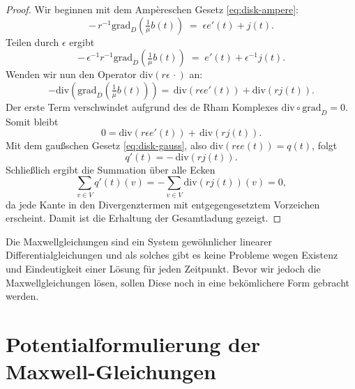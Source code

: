 \documentclass[11pt,a4paper,leqno]{report}
\numberwithin{equation}{chapter}
\begin{document}
\begin{proof}
	Wir beginnen mit dem Ampèreschen Gesetz \eqref{eq:disk-ampere}:
	\[
	-\, r^{-1}\mathrm{grad}_D\!\left(\tfrac{1}{\mu} b(t)\right) \;=\; \epsilon e'(t) + j(t).
	\]
	Teilen durch \(\epsilon\) ergibt
	\[
	-\, \epsilon^{-1}r^{-1}\mathrm{grad}_D\!\left(\tfrac{1}{\mu} b(t)\right) \;=\;  e'(t) + \epsilon^{-1}j(t).
	\]
	Wenden wir nun den Operator \(\mathrm{div}(r\epsilon\,\cdot)\) an:
	\[
	-\mathrm{div}(\mathrm{grad}_D\!\left(\tfrac{1}{\mu} b(t)\right)) 
	= \,\mathrm{div}(r\epsilon e'(t)) + \mathrm{div}(r j(t)).
	\]
	Der erste Term verschwindet aufgrund des de Rham Komplexes \(\mathrm{div}\circ \mathrm{grad}_D = 0\).  
	Somit bleibt
	\[
	0=\mathrm{div}(r\epsilon e'(t)) +\,\mathrm{div}(r j(t)).
	\]
	Mit dem gaußschen Gesetz \eqref{eq:disk-gauss}, also \(\mathrm{div}(r\epsilon e(t))=q(t)\), folgt
	\[
	q'(t) = -\,\mathrm{div}(r j(t)).
	\]
	Schließlich ergibt die Summation über alle Ecken
	\[
	\sum_{v\in V} q'(t)(v) = - \sum_{v\in V}\mathrm{div}(r j(t))(v) = 0,
	\]
	da jede Kante in den Divergenztermen mit entgegengesetztem Vorzeichen erscheint. Damit ist die Erhaltung der Gesamtladung gezeigt.
\end{proof}
\noindent
Die Maxwellgleichungen sind ein System gew\"ohnlicher linearer Differentialgleichungen und als solches gibt es keine Probleme wegen Existenz und Eindeutigkeit einer L\"osung f\"ur jeden Zeitpunkt. Bevor wir jedoch die Maxwellgleichungen l\"osen, sollen Diese noch in eine bek\"omlichere Form gebracht werden.
\section{Potentialformulierung der Maxwell-Gleichungen}
\end{document}
